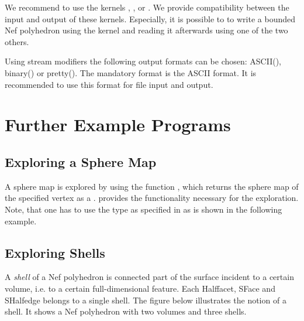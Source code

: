 We recommend
to use the \cgal kernels , , or 
. We provide compatibility between the input
and output of these kernels. Especially, it is possible to to write a 
bounded Nef polyhedron using the  kernel and 
reading it afterwards using one of the two others. 

Using \cgal stream modifiers the following output formats can be chosen: 
ASCII(), binary() or 
pretty(). The mandatory format is the ASCII format. It 
is recommended to use this format for file input and output.


\section{Further Example Programs}

\subsection{Exploring a Sphere Map}

A sphere map is explored by using the function , which 
returns the sphere map of the specified vertex as a .
 provides the functionality necessary for the
exploration.
Note, that one has to use
the type  as specified in  as 
is shown in the following example.


\subsection{Exploring Shells}

A \emph{shell} of a Nef polyhedron is connected part of the surface incident
to a certain volume, i.e. to a certain full-dimensional feature. 
Each Halffacet, SFace and SHalfedge belongs to a single
shell. The figure below illustrates the notion of a shell. It shows a Nef
polyhedron with two volumes and three shells. 


